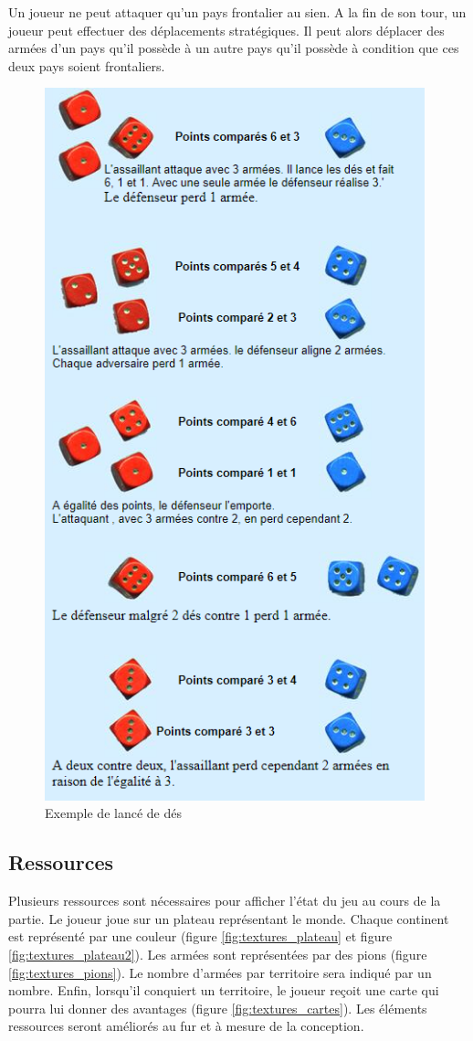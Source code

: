     Un joueur ne peut attaquer qu'un pays frontalier au sien. 
    \newline
    A la fin de son tour, un joueur peut effectuer des déplacements stratégiques. Il peut alors déplacer des armées d'un pays qu'il possède à un autre pays qu'il possède à condition que ces deux pays soient frontaliers.

\begin{figure}[!htbp]
        \centering
        \includegraphics[width=11cm]{Images/des_riskk.PNG}
        \caption{Exemple de lancé de dés}
    \end{figure}
\newpage 

\subsection{Ressources}
    Plusieurs ressources sont nécessaires pour afficher l'état du jeu au cours de la partie. 
    Le joueur joue sur un plateau représentant le monde. Chaque continent est représenté par une couleur (figure \ref{fig:textures_plateau} et figure \ref{fig:textures_plateau2}). Les armées sont représentées par des pions (figure \ref{fig:textures_pions}). Le nombre d'armées par territoire sera indiqué par un nombre. Enfin, lorsqu'il conquiert un territoire, le joueur reçoit une carte qui pourra lui donner des avantages (figure \ref{fig:textures_cartes}). Les éléments ressources seront améliorés au fur et à mesure de la conception. 
    
